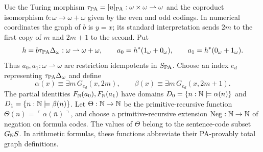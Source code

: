 Use the Turing morphism
$\tau_{\mathrm{PA}}=[u]_{\mathrm{PA}}:\omega\times\omega\rightharpoonup\omega$
and the coproduct isomorphism
$b:\omega\to\omega+\omega$ given by the even and odd codings.
In numerical coordinates the graph of $b$ is $y=x$; its standard
interpretation sends $2m$ to the first copy of $m$ and $2m+1$
to the second. Put
\[
 h=b\tau_{\mathrm{PA}}\Delta_\omega:\omega\rightharpoonup\omega+\omega,
 \qquad
 a_0=h^*(1_\omega+0_\omega),\qquad
 a_1=h^*(0_\omega+1_\omega).
\]
Thus $a_0,a_1:\omega\rightharpoonup\omega$ are restriction
idempotents in $S_{\mathrm{PA}}$.
Choose an index $e_d$ representing
$\tau_{\mathrm{PA}}\Delta_\omega$ and define
\[
 \alpha(x)\equiv\exists m\,G_{e_d}(x,2m),\qquad
 \beta(x)\equiv\exists m\,G_{e_d}(x,2m+1).
\]
The partial identities $F_{\mathbb N}(a_0),F_{\mathbb N}(a_1)$ have domains
$D_0=\{n:\mathbb N\models\alpha(n)\}$ and
$D_1=\{n:\mathbb N\models\beta(n)\}$.
Let $\Theta:\mathbb N\to\mathbb N$ be the primitive-recursive function
$\Theta(n)=\ulcorner\alpha(\bar n)\urcorner$, and choose a
primitive-recursive extension $\operatorname{Neg}:\mathbb N\to\mathbb N$
of negation on formula codes. The values of
$\Theta$ belong to the sentence-code subset $G_{\mathbb N}S$.
In arithmetic formulas,
these functions abbreviate their PA-provably total graph definitions.

